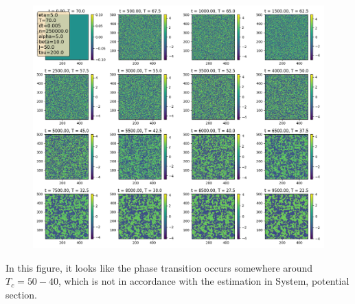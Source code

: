 	\begin{figure}[t]
		\centering
		\includegraphics[width=13cm]{graphics/500x500.png}
	\end{figure}
	In this figure, it looks like the phase transition occurs somewhere around $T_c =	50 - 40$, which is not in accordance with the estimation in System, potential section.
	
